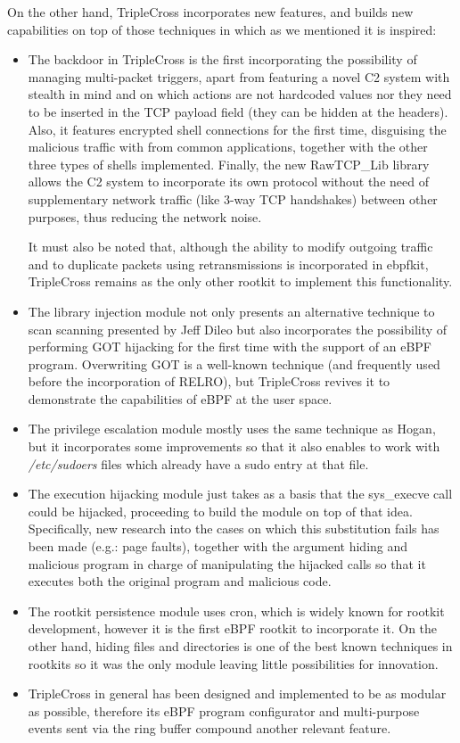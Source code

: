 On the other hand, TripleCross incorporates new features, and builds new capabilities on top of those techniques in which as we mentioned it is inspired:
\begin{itemize}
\item The backdoor in TripleCross is the first incorporating the possibility of managing multi-packet triggers, apart from featuring a novel C2 system with stealth in mind and on which actions are not hardcoded values nor they need to be inserted in the TCP payload field (they can be hidden at the headers). Also, it features encrypted shell connections for the first time, disguising the malicious traffic with from common applications, together with the other three types of shells implemented. Finally, the new RawTCP\_Lib library allows the C2 system to incorporate its own protocol without the need of supplementary network traffic (like 3-way TCP handshakes) between other purposes, thus reducing the network noise.

It must also be noted that, although the ability to modify outgoing traffic and to duplicate packets using retransmissions is incorporated in ebpfkit, TripleCross remains as the only other rootkit to implement this functionality.
\item The library injection module not only presents an alternative technique to scan scanning presented by Jeff Dileo but also incorporates the possibility of performing GOT hijacking for the first time with the support of an eBPF program. Overwriting GOT is a well-known technique (and frequently used before the incorporation of RELRO), but TripleCross revives it to demonstrate the capabilities of eBPF at the user space.

\item The privilege escalation module mostly uses the same technique as Hogan, but it incorporates some improvements so that it also enables to work with \textit{/etc/sudoers} files which already have a sudo entry at that file.

\item The execution hijacking module just takes as a basis that the sys\_execve call could be hijacked, proceeding to build the module on top of that idea. Specifically, new research into the cases on which this substitution fails has been made (e.g.: page faults), together with the argument hiding and malicious program in charge of manipulating the hijacked calls so that it executes both the original program and malicious code.

\item The rootkit persistence module uses cron, which is widely known for rootkit development, however it is the first eBPF rootkit to incorporate it. On the other hand, hiding files and directories is one of the best known techniques in rootkits so it was the only module leaving little possibilities for innovation.

\item TripleCross in general has been designed and implemented to be as modular as possible, therefore its eBPF program configurator and multi-purpose events sent via the ring buffer compound another relevant feature.
\end{itemize}

